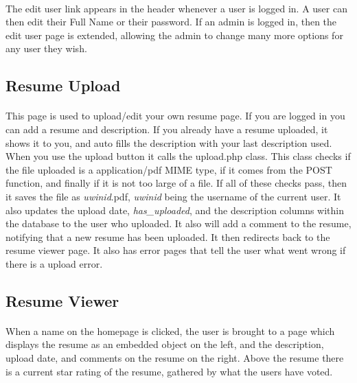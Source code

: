 \documentclass[11pt,letterpaper,titlepage]{article}
\begin{document}
        \paragraph{}
        The edit user link appears in the header whenever a user is logged in. A
        user can then edit their Full Name or their password. If an admin is
        logged in, then the edit user page is extended, allowing the admin to
        change many more options for any user they wish.

        \subsection{Resume Upload}
        \paragraph{}
        This page is used to upload/edit your own resume page. If you are logged
        in you can add a resume and description. If you already have a resume
        uploaded, it shows it to you, and auto fills the description with your
        last description used. When you use the upload button it calls the
        upload.php class. This class checks if the file uploaded is a
        application/pdf MIME type, if it comes from the POST function, and
        finally if it is not too large of a file. If all of these checks pass,
        then it saves the file as \emph{uwinid}.pdf, \emph{uwinid} being the
        username of the current user. It also updates the upload date,
        \emph{has\_uploaded}, and the description columns within the database to
        the user who uploaded.
        It also will add a comment to the resume, notifying that a new resume
        has been uploaded.
        It then redirects back to the resume viewer page.
        It also has error pages that tell the user what went wrong if there is a
        upload error.

        \subsection{Resume Viewer}
        \paragraph{}
        When a name on the homepage is clicked, the user is brought to a page
        which displays the resume as an embedded object on the left, and the
        description, upload date, and comments on the resume on the right. Above
        the resume there is a current star rating of the resume, gathered by
        what the users have voted.
\end{document}
